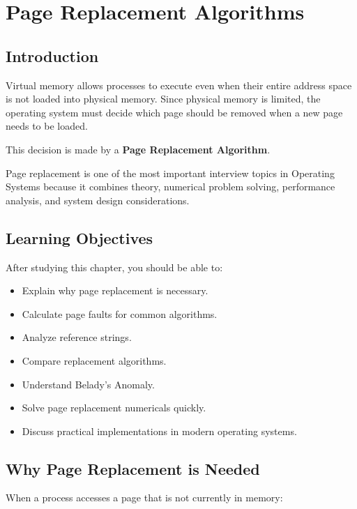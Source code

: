 \chapter{Page Replacement Algorithms}

\section{Introduction}

Virtual memory allows processes to execute even when their entire address space is not loaded into physical memory. Since physical memory is limited, the operating system must decide which page should be removed when a new page needs to be loaded.

This decision is made by a \textbf{Page Replacement Algorithm}.

Page replacement is one of the most important interview topics in Operating Systems because it combines theory, numerical problem solving, performance analysis, and system design considerations.

\section{Learning Objectives}

After studying this chapter, you should be able to:

\begin{itemize}
\item Explain why page replacement is necessary.
\item Calculate page faults for common algorithms.
\item Analyze reference strings.
\item Compare replacement algorithms.
\item Understand Belady's Anomaly.
\item Solve page replacement numericals quickly.
\item Discuss practical implementations in modern operating systems.
\end{itemize}

\section{Why Page Replacement is Needed}

When a process accesses a page that is not currently in memory:

